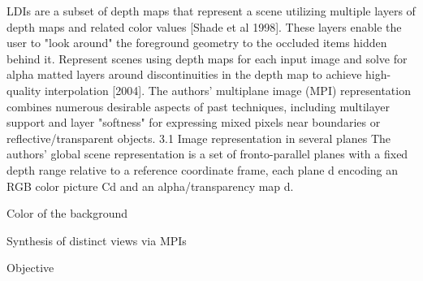 LDIs are a subset of depth maps that represent a scene utilizing multiple layers of depth maps and related color values [Shade et al 1998].
These layers enable the user to "look around" the foreground geometry to the occluded items hidden behind it.
Represent scenes using depth maps for each input image and solve for alpha matted layers around discontinuities in the depth map to achieve high-quality interpolation [2004].
The authors' multiplane image (MPI) representation combines numerous desirable aspects of past techniques, including multilayer support and layer "softness" for expressing mixed pixels near boundaries or reflective/transparent objects.
3.1 Image representation in several planes The authors' global scene representation is a set of fronto-parallel planes with a fixed depth range relative to a reference coordinate frame, each plane d encoding an RGB color picture Cd and an alpha/transparency map d.

Color of the background

Synthesis of distinct views via MPIs

Objective

